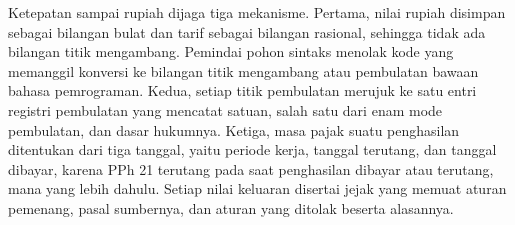 Ketepatan sampai rupiah dijaga tiga mekanisme. Pertama, nilai rupiah disimpan sebagai bilangan bulat dan tarif sebagai bilangan rasional, sehingga tidak ada bilangan titik mengambang. Pemindai pohon sintaks menolak kode  yang memanggil konversi ke bilangan titik mengambang atau pembulatan bawaan bahasa pemrograman. Kedua, setiap titik pembulatan merujuk ke satu entri registri pembulatan yang mencatat satuan, salah satu dari enam mode pembulatan, dan dasar hukumnya. Ketiga, masa pajak suatu penghasilan ditentukan dari tiga tanggal, yaitu periode kerja, tanggal terutang, dan tanggal dibayar, karena PPh 21 terutang pada saat penghasilan dibayar atau terutang, mana yang lebih dahulu. Setiap nilai keluaran disertai jejak yang memuat aturan pemenang, pasal sumbernya, dan aturan yang ditolak beserta alasannya.

